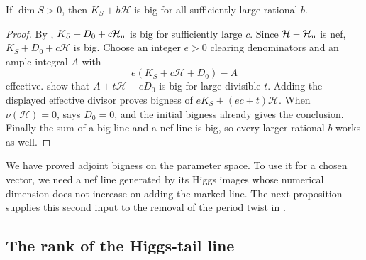 \begin{proposition}\label{prop:adjoint-bigness}
If $\dim S>0$, then $K_S+b\mathcal H$ is big for all
sufficiently large rational $b$.
\end{proposition}

\begin{proof}
By ,
$K_S+D_0+c\mathcal H_{\rm u}$ is big for sufficiently
large $c$.  Since $\mathcal H-\mathcal H_{\rm u}$ is nef,
$K_S+D_0+c\mathcal H$ is big.  Choose an integer $e>0$
clearing denominators and an ample integral $A$ with
\[
                   e(K_S+c\mathcal H+D_0)-A
\]
effective.  
show that $A+t\mathcal H-eD_0$ is big for large divisible
$t$.  Adding the displayed effective divisor proves
bigness of $eK_S+(ec+t)\mathcal H$.  When $\nu(\mathcal H)=0$,
 says $D_0=0$, and the initial
bigness already gives the conclusion.  Finally the sum
of a big line and a nef line is big, so every larger
rational $b$ works as well.
\end{proof}

We have proved adjoint bigness on the parameter space.  To use it for a
chosen vector, we need a nef line generated by its Higgs images whose
numerical dimension does not increase on adding the marked line.
The next proposition supplies this second input to the removal of the
period twist in .

\subsection{The rank of the Higgs-tail line}

